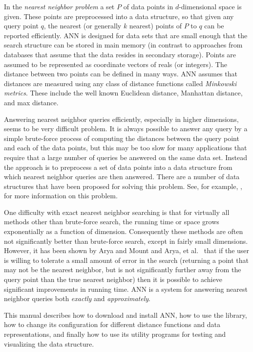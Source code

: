\documentclass[11pt]{article}		%
\newcommand{\ANN}[0]{\textsf{ANN}}
\begin{document}
In the \emph{nearest neighbor problem} a set $P$ of data points in
$d$-dimensional space is given.  These points are preprocessed into a
data structure, so that given any query point $q$, the nearest (or
generally $k$ nearest) points of $P$ to $q$ can be reported efficiently.
{\ANN} is designed for data sets that are small enough that the search
structure can be stored in main memory (in contrast to approaches from
databases that assume that the data resides in secondary storage).
Points are assumed to be represented as coordinate vectors of reals (or
integers). The distance between two points can be defined in many ways.
{\ANN} assumes that distances are measured using any class of distance
functions called \emph{Minkowski metrics}.  These include the well known
Euclidean distance, Manhattan distance, and max distance.

Answering nearest neighbor queries efficiently, especially in higher
dimensions, seems to be very difficult problem.  It is always possible
to answer any query by a simple brute-force process of computing the
distances between the query point and each of the data points, but this
may be too slow for many applications that require that a large number
of queries be answered on the same data set.  Instead the approach is to
preprocess a set of data points into a data structure from which nearest
neighbor queries are then answered.  There are a number of data
structures that have been proposed for solving this problem.  See, for
example, \cite{AMN98,Ben90,Cla97,Kle97,PrS85,Spr91}, for more
information on this problem.

One difficulty with exact nearest neighbor searching is that for
virtually all methods other than brute-force search, the running time or
space grows exponentially as a function of dimension.  Consequently
these methods are often not significantly better than brute-force
search, except in fairly small dimensions.  However, it has been shown
by Arya and Mount \cite{ArM93} and Arya, et al.~\cite{AMN98} that if the
user is willing to tolerate a small amount of error in the search
(returning a point that may not be the nearest neighbor, but is not
significantly further away from the query point than the true nearest
neighbor) then it is possible to achieve significant improvements in
running time. {\ANN} is a system for answering nearest neighbor queries
both \emph{exactly} and \emph{approximately}.

This manual describes how to download and install {\ANN}, how to use the
library, how to change its configuration for different distance
functions and data representations, and finally how to use its utility
programs for testing and visualizing the data structure.
\end{document}
